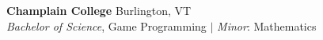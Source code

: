 \documentclass[margin]{res}
\begin{document}
\begin{resume}
\par
\textbf{Champlain College} \hfill Burlington, VT\\
{\sl Bachelor of Science}, Game Programming $\vert$ {\sl Minor}: Mathematics


\end{resume}
\end{document}

